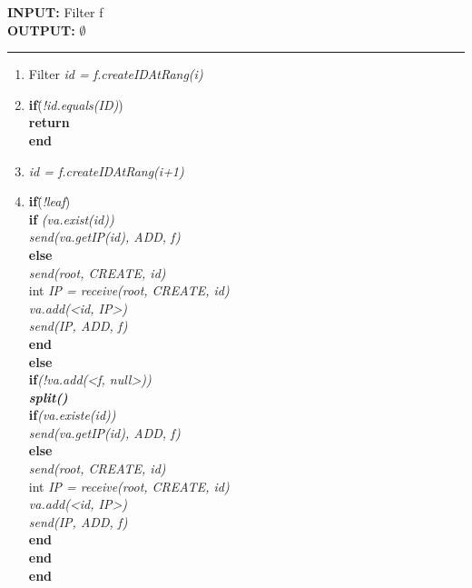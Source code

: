 \documentclass[a4paper,11pt]{report}
\begin{document}
\begin{flushleft}
	\begin{framed}
		\textbf{INPUT:} Filter f\\
		\textbf{OUTPUT:} $\emptyset$
		\noindent\rule{\linewidth}{0.5pt}

		\begin{enumerate}
			\item Filter \textit{id = f.createIDAtRang(i)}
			\item
			\begin{tabbing}
				\textbf{if}\= (\textit{!id.equals(ID)})\\
					\> \textbf{return}\\
				\textbf{end}
			\end{tabbing}
			\item \textit{id = f.createIDAtRang(i+1)}
			\item
			\begin{tabbing}
				\textbf{if}\= (\textit{!leaf})\\
					\> \textbf{if} \= \textit{(va.exist(id))} \\
					\> \> \textit{send(va.getIP(id), ADD, f)}\\
					\> \textbf{else}\\
					\> \> \textit{send(root, CREATE, id)} \\
					\> \> int \textit{IP = receive(root, CREATE, id)}\\
					\> \> \textit{va.add(<id, IP>)}\\
					\> \> \textit{send(IP, ADD, f)}\\
					\> \textbf{end}\\
				\textbf{else}\\
					\> \textbf{if}\= \textit{(!va.add(<f, null>))}\\
					\> \> \textit{\textbf{split()}}\\
					\> \> \textbf{if}\= \textit{(va.existe(id))} \\
					\> \> \> \textit{send(va.getIP(id), ADD, f)}\\
					\> \> \textbf{else}\\
					\> \> \> \textit{send(root, CREATE, id)} \\
					\> \> \> int \textit{IP = receive(root, CREATE, id)}\\
					\> \> \> \textit{va.add(<id, IP>)}\\
					\> \> \> \textit{send(IP, ADD, f)}\\
					\> \> \textbf{end}\\
					\> \textbf{end}\\
				\textbf{end}
			\end{tabbing}
		\end{enumerate}
	\end{framed}
\end{flushleft}
\end{document}
